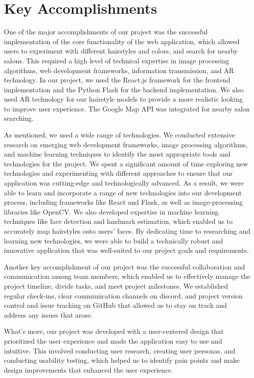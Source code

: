 \documentclass{article}
\begin{document}
\section{Key Accomplishments}
  
One of the major accomplishments of our project was the successful implementation of the core functionality of the web application, which allowed users to experiment with different hairstyles and colors, and search for nearby salons. This required a high level of technical expertise in image processing algorithms, web development frameworks, information transmission, and AR technology. In our project, we used the React.js framework for the frontend implementation and the Python Flask for the backend implementation. We also used AR technology for our hairstyle models to provide a more realistic looking to improve user experience. The Google Map API was integrated for nearby salon searching. 

As mentioned, we used a wide range of technologies. We conducted extensive research on emerging web development frameworks, image processing algorithms, and machine learning techniques to identify the most appropriate tools and technologies for the project. We spent a significant amount of time exploring new technologies and experimenting with different approaches to ensure that our application was cutting-edge and technologically advanced. As a result, we were able to learn and incorporate a range of new technologies into our development process, including frameworks like React and Flask, as well as image-processing libraries like OpenCV. We also developed expertise in machine learning techniques like face detection and landmark estimation, which enabled us to accurately map hairstyles onto users' faces. By dedicating time to researching and learning new technologies, we were able to build a technically robust and innovative application that was well-suited to our project goals and requirements.

Another key accomplishment of our project was the successful collaboration and communication among team members, which enabled us to effectively manage the project timeline, divide tasks, and meet project milestones. We established regular check-ins, clear communication channels on discord, and project version control and issue tracking on GitHub that allowed us to stay on track and address any issues that arose.

What's more, our project was developed with a user-centered design that prioritized the user experience and made the application easy to use and intuitive. This involved conducting user research, creating user personas, and conducting usability testing, which helped us to identify pain points and make design improvements that enhanced the user experience.
\end{document}
